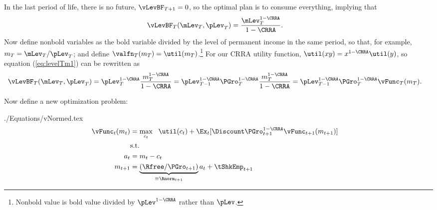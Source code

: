 \documentclass[titlepage]{\econtex}
\begin{document}
In the last period of life, there is no
future, $\vLevBF_{T+1} = 0$, so
the optimal plan is to consume everything, implying that
\begin{equation}\begin{gathered}\begin{aligned}
  \vLevBF_{T}(\mLev_{T},\pLev_{T})  & = \frac{\mLev_{T}^{1-\CRRA}}{1-\CRRA}. \label{eq:levelTm1}
\end{aligned}\end{gathered}\end{equation}
Now define nonbold variables as the bold variable divided by
the level of permanent income in the same period, so that, for
example, ${m}_{T}=\mLev_{T}/\pLev_{T}$; and define
$\valfn_{T}({m}_{T}) = \util({m}_{T})$.\footnote{Nonbold value is bold value divided by $\pLev^{1-\CRRA}$ rather than $\pLev$.}  For our CRRA utility function, $\util(xy)=x^{1-\CRRA}\util(y)$, so equation (\ref{eq:levelTm1}) can be
rewritten as
\begin{equation*}\begin{gathered}\begin{aligned}
  \vLevBF_{T}(\mLev_{T},\pLev_{T})  & = \pLev_{T}^{1-\CRRA}\frac{{m}_{T}^{1-\CRRA}}{1-\CRRA} = \pLev_{T-1}^{1-\CRRA}\PGro_{T}^{1-\CRRA}\frac{{m}_{T}^{1-\CRRA}}{1-\CRRA}  = \pLev_{T-1}^{1-\CRRA}\PGro_{T}^{1-\CRRA}\vFunc_{T}({m}_{T}).
\end{aligned}\end{gathered}\end{equation*}


Now define a new optimization problem:
\begin{verbatimwrite}{./Equations/vNormed.tex}
  \begin{equation}\begin{gathered}\begin{aligned}
    \null{\vFunc}_{t}({m}_{t})  & = \max_{{c}_{t}} ~~ \util({c}_{t})+
                                     \Ex_{t}[{\Discount} \PGro_{t+1}^{1-\CRRA}\null{\vFunc}_{t+1}({m}_{t+1})] \label{vtNorm}
    \\         & \text{s.t.} &   \nonumber \\
    {a}_{t}    & = {m}_{t}-{c}_{t} \nonumber
    \\      {m}_{t+1}  & = \underbrace{\left(\Rfree/\PGro_{t+1}\right)}_{\equiv \Rnorm_{t+1}}{a}_{t}+\tShkEmp_{t+1} \nonumber
  \end{aligned}\end{gathered}\end{equation}
\end{verbatimwrite}

\end{document}
